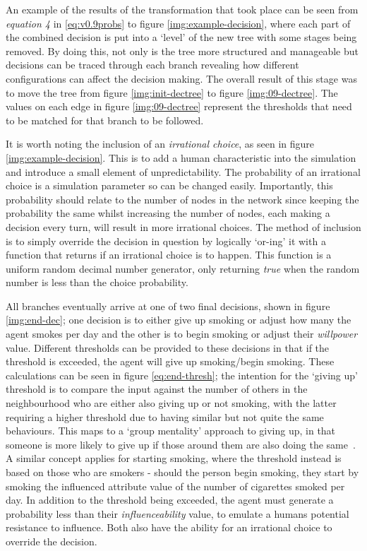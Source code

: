 \documentclass[]{report}
\begin{document}
An example of the results of the transformation that took place can be seen from \emph{equation 4} in \ref{eq:v0.9probs} to figure \ref{img:example-decision}, where each part of the combined decision is put into a `level' of the new tree with some stages being removed. By doing this, not only is the tree more structured and manageable but decisions can be traced through each branch revealing how different configurations can affect the decision making. The overall result of this stage was to move the tree from figure \ref{img:init-dectree} to figure \ref{img:09-dectree}. The values on each edge in figure \ref{img:09-dectree} represent the thresholds that need to be matched for that branch to be followed.

It is worth noting the inclusion of an \emph{irrational choice}, as seen in figure \ref{img:example-decision}. This is to add a human characteristic into the simulation and introduce a small element of unpredictability. The probability of an irrational choice is a simulation parameter so can be changed easily. Importantly, this probability should relate to the number of nodes in the network since keeping the probability the same whilst increasing the number of nodes, each making a decision every turn, will result in more irrational choices. The method of inclusion is to simply override the decision in question by logically `or-ing' it with a function that returns if an irrational choice is to happen. This function is a uniform random decimal number generator, only returning \emph{true} when the random number is less than the choice probability.

All branches eventually arrive at one of two final decisions, shown in figure \ref{img:end-dec}; one decision is to either give up smoking or adjust how many the agent smokes per day and the other is to begin smoking or adjust their \emph{willpower} value. Different thresholds can be provided to these decisions in that if the threshold is exceeded, the agent will give up smoking/begin smoking. These calculations can be seen in figure \ref{eq:end-thresh}; the intention for the `giving up' threshold is to compare the input against the number of others in the neighbourhood who are either also giving up or not smoking, with the latter requiring a higher threshold due to having similar but not quite the same behaviours. This maps to a `group mentality' approach to giving up, in that someone is more likely to give up if those around them are also doing the same~\cite{droves}. A similar concept applies for starting smoking, where the threshold instead is based on those who are smokers - should the person begin smoking, they start by smoking the influenced attribute value of the number of cigarettes smoked per day. In addition to the threshold being exceeded, the agent must generate a probability less than their \emph{influenceability} value, to emulate a humans potential resistance to influence. Both also have the ability for an irrational choice to override the decision.
\end{document}
